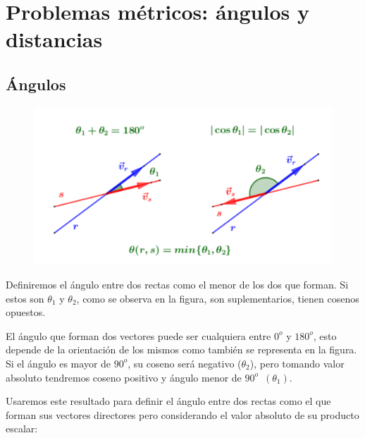 \vspace{1cm}
\section{Problemas métricos: ángulos y distancias}
\vspace{0.5cm}

\subsection{Ángulos}
\vspace{0.5cm}

\begin{figure}[H]
	\centering
	\includegraphics[width=.75\textwidth]{img-ga/ga18.png}
\end{figure}

Definiremos el ángulo entre dos rectas como el menor de los dos que forman. Si estos son $\theta_1$ y $\theta_2$, como se observa en la figura, son suplementarios, tienen cosenos opuestos. 

El ángulo que forman dos vectores puede ser cualquiera entre $0^o$ y $180^o$, esto depende de la orientación de los mismos como también se representa en la figura. Si el ángulo es mayor de $90^o$, su coseno será negativo ($\theta_2$), pero tomando valor absoluto tendremos coseno positivo y ángulo menor de $90^o$ $\, (\theta_1)$. 

Usaremos este resultado para definir el ángulo entre dos rectas como el que forman sus vectores directores pero considerando el valor absoluto de su producto escalar:

